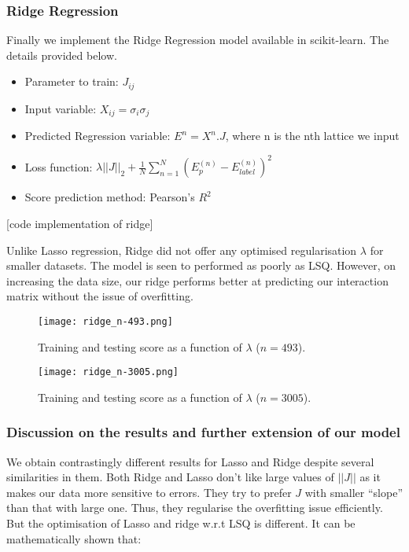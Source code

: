 \subsubsection{Ridge Regression}
Finally we implement the Ridge Regression model available in scikit-learn. The details provided below.
\begin{itemize}
    \item Parameter to train: \(J_{ij}\)
    \item Input variable: \(X_{ij}=\sigma_i\sigma_j\)
    \item Predicted Regression variable: \(E^n=X^n.J\), where n is the nth lattice we input
    \item Loss function: \(\lambda ||J||_2 + \frac{1}{N} \sum_{n=1}^N(E_p^{(n)}-E_{label}^{(n)})^2\)
    \item Score prediction method: Pearson's \(R^2\)
\end{itemize}

[code implementation of ridge]

Unlike Lasso regression, Ridge did not offer any optimised regularisation \(\lambda\) for smaller datasets.
The model is seen to performed as poorly as LSQ.
However, on increasing the data size, our ridge performs better at predicting our interaction matrix without the issue of overfitting.

\begin{figure}[h!]
    \centering
    \texttt{[image: ridge\_n-493.png]}
    \caption{Training and testing score as a function of \( \lambda \) (\( n=493 \)).}
\end{figure}

\begin{figure}[h!]
    \centering
    \texttt{[image: ridge\_n-3005.png]}
    \caption{Training and testing score as a function of \( \lambda \) (\( n=3005 \)).}
\end{figure}



\subsubsection{Discussion on the results and further extension of our model}

We obtain contrastingly different results for Lasso and Ridge despite several similarities in them.
Both Ridge and Lasso don't like large values of \(||J||\) as it makes our data more sensitive to errors. They try to prefer $J$ with smaller ``slope'' than that with large one.
Thus, they regularise the overfitting issue efficiently.
But the optimisation of Lasso and ridge w.r.t LSQ is different.
It can be mathematically shown that:

